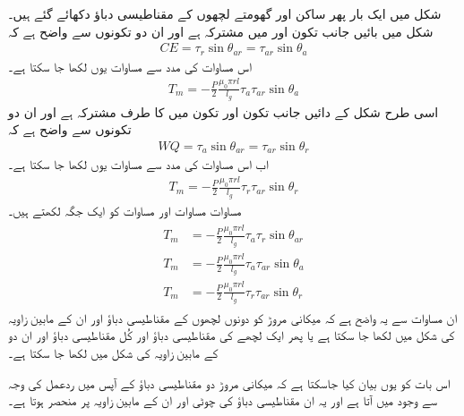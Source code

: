 شکل  میں ایک بار پھر ساکن اور گھومتے لچھوں کے مقناطیسی دباؤ دکھائے گئے ہیں۔ شکل میں بائیں جانب تکون  اور  میں  مشترکہ ہے اور ان دو تکونوں سے واضح ہے کہ
\begin{align}
CE=\tau_r \sin \theta_{ar}=\tau_{ar} \sin \theta_a
\end{align}
اس مساوات کی مدد سے مساوات  یوں لکھا جا سکتا ہے۔
\begin{align}
T_m=-\frac{P}{2}\frac{\mu_0 \pi r l}{l_g} \tau_a \tau_{ar}  \sin \theta_a
\end{align}
اسی طرح شکل  کے دائیں جانب تکون  اور تکون  میں  کا طرف مشترکہ ہے اور ان دو تکونوں سے واضح ہے کہ
\begin{align}
WQ=\tau_a \sin \theta_{ar}=\tau_{ar} \sin \theta_r
\end{align}
اب اس مساوات کی مدد سے مساوات  یوں لکھا جا سکتا ہے۔
\begin{align}
T_m=-\frac{P}{2}\frac{\mu_0 \pi r l}{l_g} \tau_r \tau_{ar}  \sin \theta_r
\end{align}
مساوات  مساوات  اور مساوات  کو ایک جگہ لکھتے ہیں۔
\begin{gather}
\begin{aligned}
T_m&=-\frac{P}{2}\frac{\mu_0 \pi r l}{l_g} \tau_a \tau_r \sin \theta_{ar}\\
T_m&=-\frac{P}{2}\frac{\mu_0 \pi r l}{l_g} \tau_a \tau_{ar}  \sin \theta_a\\
T_m&=-\frac{P}{2}\frac{\mu_0 \pi r l}{l_g} \tau_r \tau_{ar}  \sin \theta_r
\end{aligned}
\end{gather}
ان مساوات سے یہ واضح ہے کہ میکانی مروڑ کو دونوں لچھوں کے مقناطیسی دباؤ اور ان کے مابین زاویہ کی شکل میں لکھا جا سکتا ہے یا پھر ایک لچھے کی مقناطیسی دباؤ اور کُل مقناطیسی دباؤ اور ان دو کے مابین زاویہ کی شکل میں لکھا جا سکتا ہے۔

اس بات کو یوں بیان کیا جاسکتا ہے کہ میکانی مروڑ دو مقناطیسی دباؤ کے آپس میں ردعمل کی وجہ سے وجود میں آتا ہے اور یہ ان مقناطیسی دباؤ کی چوٹی اور ان کے مابین زاویہ پر منحصر ہوتا ہے۔

